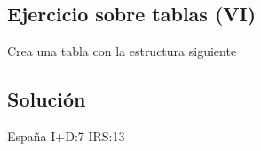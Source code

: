 \documentclass[letterpaper,10pt,spanish]{sphinxmanual}
\begin{document}
\subsection{Ejercicio sobre tablas (VI)}
\label{\detokenize{tema2:ejercicio-sobre-tablas-vi}}
Crea una tabla con la estructura siguiente

\begin{figure}[htbp]
\centering

\noindent{}
\end{figure}


\subsection{Solución}
\label{\detokenize{tema2:id4}}
\begin{sphinxVerbatim}[commandchars=\\\{\}]
 
                        España
                                 
                                                        I+D:7\PYGZpc{}
                                                        IRS:13\PYGZpc{}

\end{sphinxVerbatim}
\end{document}

